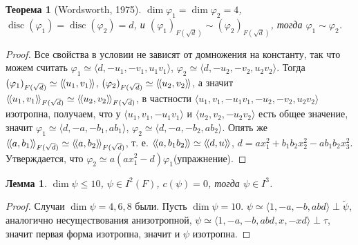 \documentclass{article}
\newtheorem*{theorem}{Теорема}
\newtheorem*{lemma}{Лемма}
\theoremstyle{definition}
\theoremstyle{remark}
\DeclareMathOperator{\disc}{disc}
\newcommand{\llangle}{\langle \hspace{-.5mm} \langle}
\newcommand{\rrangle}{\rangle \hspace{-.5mm} \rangle}
\begin{document}
\begin{theorem}[Wordsworth, 1975]
    $\dim \varphi_1 = \dim \varphi_2 = 4$, $\disc(\varphi_1) = \disc(\varphi_2) = d$, и $(\varphi_1)_{F(\sqrt{d})} \sim (\varphi_2)_{F(\sqrt{d})}$, тогда $\varphi_1 \sim \varphi_2$.
\end{theorem}
\begin{proof}
    Все свойства в условии не зависят от домножения на константу, так что можем считать
    $\varphi_1 \simeq \langle d, -u_1, -v_1, u_1v_1 \rangle$, $\varphi_2 \simeq \langle d, -u_2, -v_2, u_2v_2\rangle$. Тогда $(\varphi_1)_{F(\sqrt{d})} \simeq \llangle u_1, v_1 \rrangle$, $(\varphi_2)_{F(\sqrt{d})} \simeq \llangle u_2, v_2 \rrangle$, а значит $\llangle u_1, v_1 \rrangle_{F(\sqrt{d})} \simeq \llangle u_2, v_2 \rrangle_{F(\sqrt{d})}$, в частности $\langle u_1, v_1, -u_1v_1, -u_2, -v_2, u_2v_2 \rangle$ изотропна, получаем, что у $\langle u_1, v_1, -u_1 v_1 \rangle$ и $\langle u_2, v_2, -u_2 v_2 \rangle$ есть общее значение, значит $\varphi_1 \simeq \langle d, -a, -b_1, ab_1 \rangle$, $\varphi_2 \simeq \langle d, -a, -b_2, ab_2 \rangle$. Опять же $\llangle a, b_1 \rrangle_{F(\sqrt{d})} \simeq \llangle a, b_2 \rrangle_{F(\sqrt{d})}$, т. е. $\llangle a, b_1b_2 \rrangle \simeq \llangle d, u \rrangle$, $d = ax_1^2 + b_1 b_2 x_2^2 - ab_1 b_2 x_3^2$. Утверждается, что $\varphi_2 \simeq a(ax_1^2 - d) \varphi_1$(упражнение).
\end{proof}

\begin{lemma}
    $\dim \psi \leq 10$, $\psi \in I^2(F)$, $c(\psi) = 0$, тогда $\psi \in I^3$.
\end{lemma}
\begin{proof}
    Случаи $\dim \psi = 4, 6, 8$ были. Пусть $\dim \psi = 10$. $\psi \simeq \langle 1, -a, -b, abd \rangle \perp \tilde{\psi}$, аналогично несуществования анизотропной, $\psi \simeq \langle 1, -a, -b, abd, x, -xd \rangle \perp \tau$, значит первая форма изотропна, значит и $\psi$ изотропна. 
\end{proof}
\end{document}
